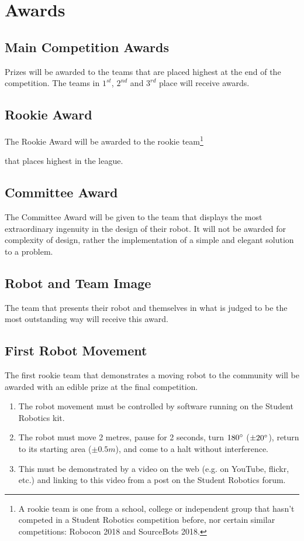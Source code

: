 \section {Awards}
\label{sec:Awards}

\subsection{Main Competition Awards}
Prizes will be awarded to the teams that are placed highest at the end of the competition.
The teams in $1^{st}$, $2^{nd}$ and $3^{rd}$ place will receive awards.

\subsection{Rookie Award}
The Rookie Award will be awarded to the rookie
team\footnote{A rookie team is one from a school, college or independent group that hasn't competed in a Student Robotics competition before, nor certain similar competitions: Robocon 2018 and SourceBots 2018.}\addtocounter{footnote}{-1}\addtocounter{Hfootnote}{-1}
 that places highest in the league.

\subsection{Committee Award}
The Committee Award will be given to the team that displays the most extraordinary ingenuity in the design of their robot.
It will not be awarded for complexity of design, rather the implementation of a simple and elegant solution to a problem.

\subsection{Robot and Team Image}
The team that presents their robot and themselves in what is judged to be the most outstanding way will receive this award.

\subsection{First Robot Movement}
The first rookie team\footnotemark{} that demonstrates a moving robot to the community will be awarded with an edible prize at the final competition.
\begin{enumerate}
\item The robot movement must be controlled by software running on the Student Robotics kit.
\item The robot must move 2 metres, pause for 2 seconds, turn $180\degree$ ($\pm20\degree$), return to its starting area ($\pm0.5m$), and come to a halt without interference.
\item This must be demonstrated by a video on the web (e.g. on YouTube, flickr, etc.) and linking to this video from a post on the Student Robotics forum.
\end{enumerate}

